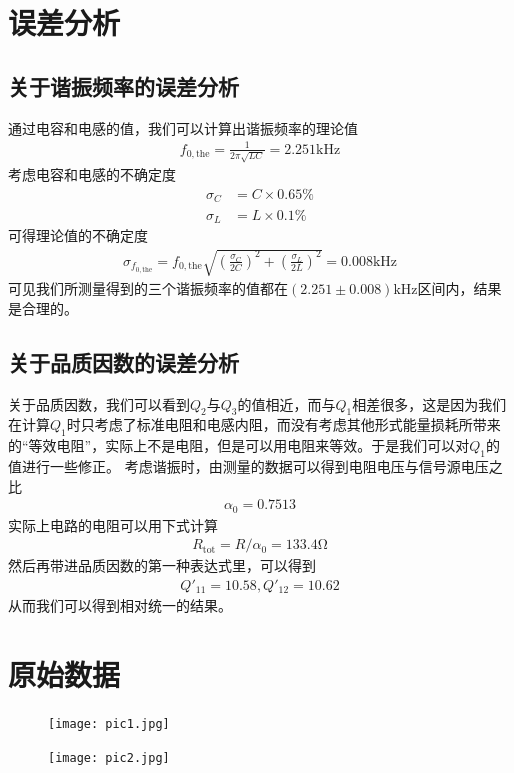 \documentclass[a4paper]{ctexart}
\begin{document}
	\section{误差分析}
	\subsection{关于谐振频率的误差分析}
	通过电容和电感的值，我们可以计算出谐振频率的理论值
	\begin{align}
		f_{0,\mathrm{the}}=\frac{1}{2\pi\sqrt{LC}}=2.251\mathrm{kHz}
	\end{align}
	考虑电容和电感的不确定度
	\begin{align}
		\sigma_C&=C\times 0.65\%\\
		\sigma_L&=L\times 0.1\%
	\end{align}
	可得理论值的不确定度
	\begin{align}
		\sigma_{f_{0,\mathrm{the}}}=f_{0,\mathrm{the}}\sqrt{\left(\frac{\sigma_C}{2C}\right)^2+\left(\frac{\sigma_L}{2L}\right)^2}=0.008\mathrm{kHz}
	\end{align}
	可见我们所测量得到的三个谐振频率的值都在$(2.251\pm0.008)\mathrm{kHz}$区间内，结果是合理的。
	\subsection{关于品质因数的误差分析}
	关于品质因数，我们可以看到$Q_2$与$Q_3$的值相近，而与$Q_1$相差很多，这是因为我们在计算$Q_1$时只考虑了标准电阻和电感内阻，而没有考虑其他形式能量损耗所带来的“等效电阻”，实际上不是电阻，但是可以用电阻来等效。于是我们可以对$Q_1$的值进行一些修正。
	考虑谐振时，由测量的数据可以得到电阻电压与信号源电压之比
	\begin{align}
		\alpha_0=0.7513
	\end{align}
	实际上电路的电阻可以用下式计算
	\begin{align}
		R_{\mathrm{tot}}=R/\alpha_0=133.4\mathrm{\Omega}
	\end{align}
	然后再带进品质因数的第一种表达式里，可以得到
	\begin{align}
		Q'_{11}=10.58,Q'_{12}=10.62
	\end{align}
	从而我们可以得到相对统一的结果。
	\section{原始数据}
	\begin{figure}[H]
		\centering
		\texttt{[image: pic1.jpg]}
	\end{figure}
	\begin{figure}[H]
		\centering
		\texttt{[image: pic2.jpg]}
	\end{figure}
\end{document}
